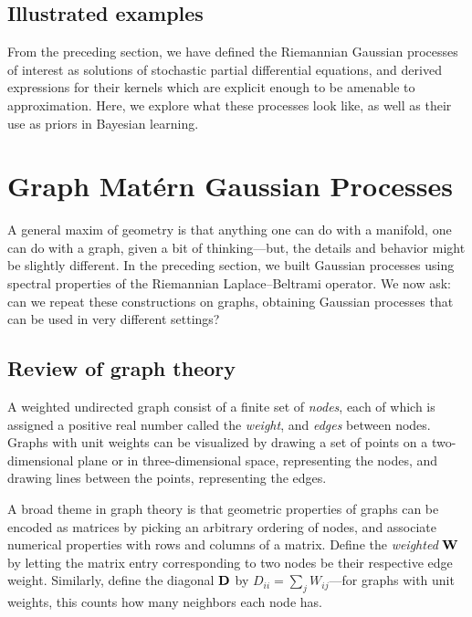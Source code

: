 \documentclass[11pt]{book}
\begin{document}
\subsection{Illustrated examples}

From the preceding section, we have defined the Riemannian Gaussian processes of interest as solutions of stochastic partial differential equations, and derived expressions for their kernels which are explicit enough to be amenable to approximation. 
Here, we explore what these processes look like, as well as their use as priors in Bayesian learning.

\section{Graph Matérn Gaussian Processes}

A general maxim of geometry is that anything one can do with a manifold, one can do with a graph, given a bit of thinking---but, the details and behavior might be slightly different.
In the preceding section, we built Gaussian processes using spectral properties of the Riemannian Laplace--Beltrami operator.
We now ask: can we repeat these constructions on graphs, obtaining Gaussian processes that can be used in very different settings?

\subsection{Review of graph theory}

A weighted undirected graph consist of a finite set of \emph{nodes}, each of which is assigned a positive real number called the \emph{weight}, and \emph{edges} between nodes.
Graphs with unit weights can be visualized by drawing a set of points on a two-dimensional plane or in three-dimensional space, representing the nodes, and drawing lines between the points, representing the edges.

A broad theme in graph theory is that geometric properties of graphs can be encoded as matrices by picking an arbitrary ordering of nodes, and associate numerical properties with rows and columns of a matrix.
Define the \emph{weighted } $\m{W}$ by letting the matrix entry corresponding to two nodes be their respective edge weight.
Similarly, define the diagonal  $\m{D}$ by $D_{ii} = \sum_j W_{ij}$---for graphs with unit weights, this counts how many neighbors each node has.
\end{document}
